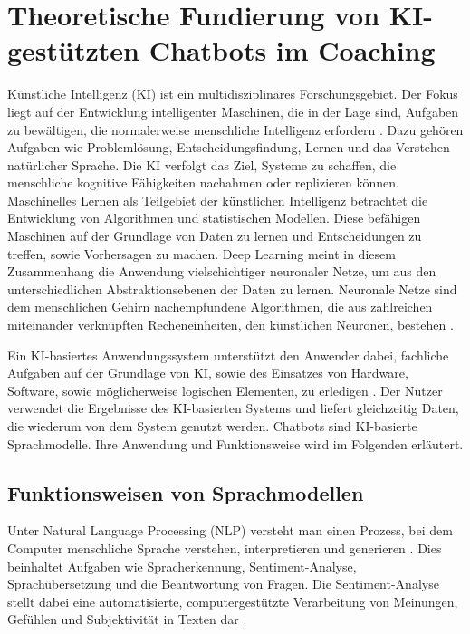 \chapter{Theoretische Fundierung von KI-gestützten Chatbots im Coaching} \label{chap:2}
Künstliche Intelligenz (KI) ist ein multidisziplinäres Forschungsgebiet. Der Fokus liegt auf der Entwicklung intelligenter Maschinen, die in der Lage sind, Aufgaben zu bewältigen, die normalerweise menschliche Intelligenz erfordern \citep{Sangeetha2023Introduction}. Dazu gehören Aufgaben wie Problemlösung, Entscheidungsfindung, Lernen und das Verstehen natürlicher Sprache. Die KI verfolgt das Ziel, Systeme zu schaffen, die menschliche kognitive Fähigkeiten nachahmen oder replizieren können. Maschinelles Lernen als Teilgebiet der künstlichen Intelligenz betrachtet die Entwicklung von Algorithmen und statistischen Modellen. Diese befähigen Maschinen auf der Grundlage von Daten zu lernen und Entscheidungen zu treffen, sowie Vorhersagen zu machen. Deep Learning meint in diesem Zusammenhang die Anwendung vielschichtiger neuronaler Netze, um aus den unterschiedlichen Abstraktionsebenen der Daten zu lernen. 
Neuronale Netze sind dem menschlichen Gehirn nachempfundene Algorithmen, die aus zahlreichen miteinander verknüpften Recheneinheiten, den künstlichen Neuronen, bestehen \citep{goodfellow2016deep}.

Ein KI-basiertes Anwendungssystem unterstützt den Anwender dabei, fachliche Aufgaben auf der Grundlage von KI, sowie des Einsatzes von Hardware, Software, sowie möglicherweise logischen Elementen, zu erledigen \citep{grum2022construction}. Der Nutzer verwendet die Ergebnisse des KI-basierten Systems und liefert gleichzeitig Daten, die wiederum von dem System genutzt werden.
Chatbots sind KI-basierte Sprachmodelle. Ihre Anwendung und Funktionsweise wird im Folgenden erläutert.

\section{Funktionsweisen von Sprachmodellen}
Unter Natural Language Processing (NLP) versteht man einen Prozess, bei dem Computer menschliche Sprache verstehen, interpretieren und generieren \citep{Sangeetha2023Introduction}. Dies beinhaltet Aufgaben wie Spracherkennung, Sentiment-Analyse, Sprachübersetzung und die Beantwortung von Fragen. Die Sentiment-Analyse stellt dabei eine automatisierte, computergestützte Verarbeitung von Meinungen, Gefühlen und Subjektivität in Texten dar \citep{pang2008opinion}.

